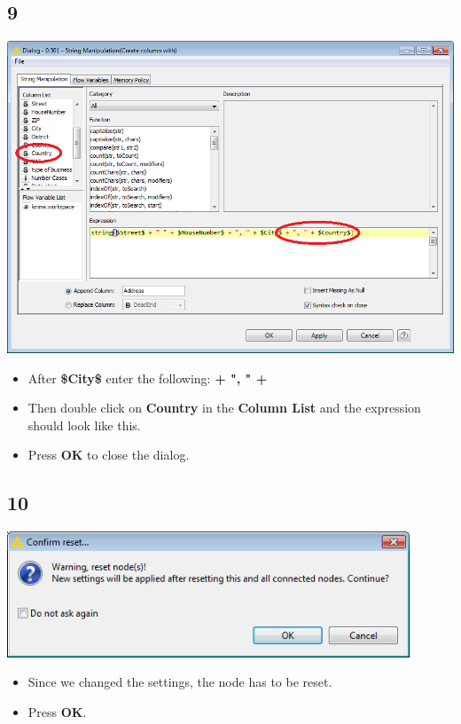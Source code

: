 \documentclass{beamer}
\begin{document}
\subsection{9}
\begin{frame}
	\begin{center}
  		\includegraphics[height=0.6\textheight]{9.png}
	\end{center}
	\begin{itemize}
		\item After \textbf{\$City\$} enter the following: \textbf{+ ", " +}
		\item Then double click on \textbf{Country} in the \textbf{Column List} and the expression should look like this.
		\item Press \textbf{OK} to close the dialog.
	\end{itemize}
\end{frame}

\subsection{10}
\begin{frame}
	\begin{center}
  		\includegraphics[width=0.9\textwidth]{10.png}
	\end{center}
	\begin{itemize}
		\item Since we changed the settings, the node has to be reset.
		\item Press \textbf{OK}.
	\end{itemize}
\end{frame}
\end{document}
